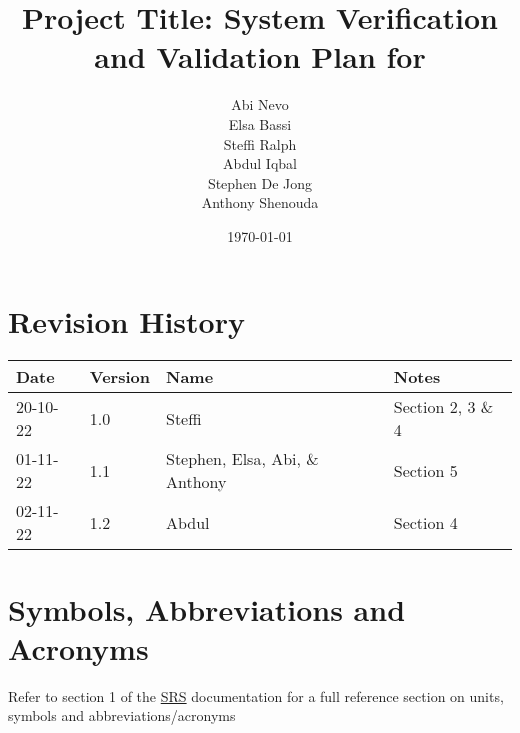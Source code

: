 \documentclass[12pt, titlepage]{article}
\begin{document}
\title{Project Title: System Verification and Validation Plan for } 
\author{Abi Nevo\\Elsa Bassi\\Steffi Ralph\\Abdul Iqbal\\Stephen De Jong\\Anthony Shenouda}
\date{\today}
	
\maketitle


\section{Revision History}

\begin{tabularx}{\textwidth}{p{2cm}p{2cm}p{2cm}X}
\toprule {\bf Date} & {\bf Version} & {\bf Name} & {\bf Notes}\\
\midrule
20-10-22 & 1.0 & Steffi & Section 2, 3 \& 4\\
01-11-22 & 1.1 & Stephen, Elsa, Abi, \& Anthony & Section 5\\
02-11-22 & 1.2 & Abdul & Section 4\\
\bottomrule
\end{tabularx}

\newpage

\tableofcontents

\listoftables
{}

\listoffigures
{}

\newpage

\section{Symbols, Abbreviations and Acronyms}

Refer to section 1 of the \href{https://github.com/NevoAbigail/Capstone/blob/main/docs/SRS/SRS.pdf}{SRS} documentation for a full reference section on units, symbols and abbreviations/acronyms


\newpage

\end{document}
